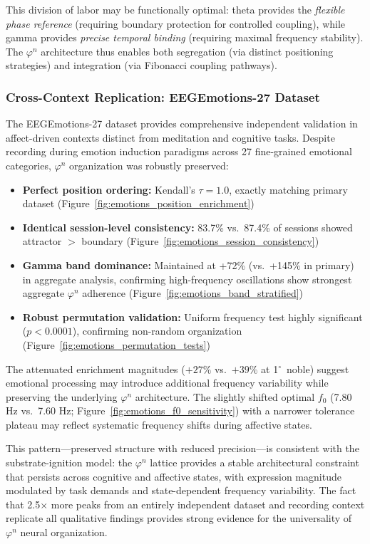 \documentclass[11pt,a4paper]{article}
\newcommand{\degree}{$^\circ$}  %
\newcommand{\phisym}{\varphi}
\begin{document}
This division of labor may be functionally optimal: theta provides the \textit{flexible phase reference} (requiring boundary protection for controlled coupling), while gamma provides \textit{precise temporal binding} (requiring maximal frequency stability). The $\phisym^n$ architecture thus enables both segregation (via distinct positioning strategies) and integration (via Fibonacci coupling pathways).

\subsubsection{Cross-Context Replication: EEGEmotions-27 Dataset}
The EEGEmotions-27 dataset \parencite{huy2025eeg} provides comprehensive independent validation in affect-driven contexts distinct from meditation and cognitive tasks. Despite recording during emotion induction paradigms across 27 fine-grained emotional categories, $\phisym^n$ organization was robustly preserved:

\begin{itemize}
    \item \textbf{Perfect position ordering:} Kendall's $\tau = 1.0$, exactly matching primary dataset (Figure~\ref{fig:emotions_position_enrichment})
    \item \textbf{Identical session-level consistency:} 83.7\% vs.\ 87.4\% of sessions showed attractor $>$ boundary (Figure~\ref{fig:emotions_session_consistency})
    \item \textbf{Gamma band dominance:} Maintained at +72\% (vs.\ +145\% in primary) in aggregate analysis, confirming high-frequency oscillations show strongest aggregate $\phisym^n$ adherence (Figure~\ref{fig:emotions_band_stratified})
    \item \textbf{Robust permutation validation:} Uniform frequency test highly significant ($p < 0.0001$), confirming non-random organization (Figure~\ref{fig:emotions_permutation_tests})
\end{itemize}

The attenuated enrichment magnitudes ($+27\%$ vs.\ $+39\%$ at 1\degree\ noble) suggest emotional processing may introduce additional frequency variability while preserving the underlying $\phisym^n$ architecture. The slightly shifted optimal $f_0$ (7.80 Hz vs.\ 7.60 Hz; Figure~\ref{fig:emotions_f0_sensitivity}) with a narrower tolerance plateau may reflect systematic frequency shifts during affective states.

This pattern---preserved structure with reduced precision---is consistent with the substrate-ignition model: the $\phisym^n$ lattice provides a stable architectural constraint that persists across cognitive and affective states, with expression magnitude modulated by task demands and state-dependent frequency variability. The fact that 2.5$\times$ more peaks from an entirely independent dataset and recording context replicate all qualitative findings provides strong evidence for the universality of $\phisym^n$ neural organization.
\end{document}
